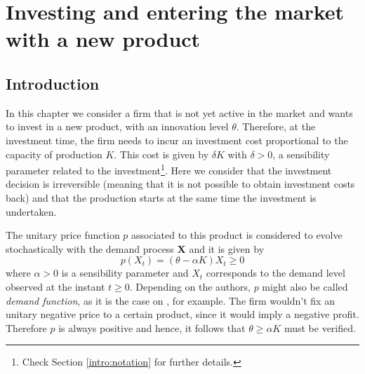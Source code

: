 


\chapter{Investing and entering the market with a new product}
\label{chapter:1}



\section{Introduction}
\label{section:overview}

In this chapter we consider a firm that %
is not yet active in the market and wants to invest in a new product, with an innovation level $\theta$. Therefore, at the investment time, the firm needs to incur an investment cost proportional to the capacity of production $K$. This cost is given by $\delta K$ with $\delta>0$, a sensibility parameter related to the investment\footnote{Check Section \ref{intro:notation} for further details.}. Here we consider that the investment decision is irreversible (meaning that it is not possible to obtain investment costs back) and that the production starts at the same time the investment is undertaken.


The unitary price function $p$ associated to this product is considered to evolve stochastically with the demand process \textbf{X} and it is given by
\begin{equation}
p(X_t)=(\theta-\alpha K) X_t \geq 0
\label{prob1:p}
\end{equation}
where $\alpha>0$ is a sensibility parameter and $X_t$ corresponds to the demand level observed at the instant $t\geq0$. Depending on the authors, $p$ might also be called \textit{demand function}, as it is the case on \cite{rita}, for example. The firm wouldn't fix an unitary negative price to a certain product, since it would imply a negative profit. Therefore $p$ is always positive and hence, it follows that $\theta \geq \alpha K$ must be verified.

